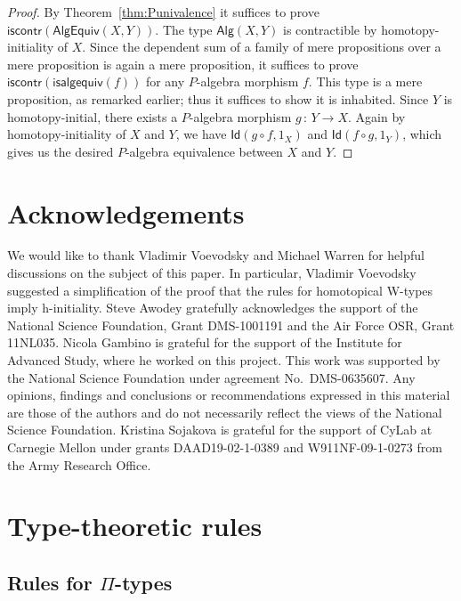\documentclass[10pt,a4paper,oneside,reqno]{amsart}
\theoremstyle{mythm}
\theoremstyle{mydef}
\theoremstyle{myrmk}
\newcommand{\co}{\,{:}\,}
\newcommand{\iscontr}{\mathsf{iscontr}}
\newcommand{\Id}{\mathsf{Id}}
\newcommand{\Palg}{\mathsf{Alg}}
\newcommand{\isalgequiv}{\mathsf{isalgequiv}}
\newcommand{\AlgEquiv}{\mathsf{AlgEquiv}}
\begin{document}
\begin{proof}
By Theorem~\ref{thm:Punivalence} it suffices to prove $\iscontr(\AlgEquiv(X,Y))$. The type $\Palg(X,Y)$ is contractible by homotopy-initiality of $X$. Since the dependent sum of a family of mere propositions over a mere proposition is again a mere proposition, it suffices to prove $\iscontr(\isalgequiv(f))$ for any $P$-algebra morphism $f$. This type is a mere proposition, as remarked earlier; thus it suffices to show it is inhabited.
Since $Y$ is homotopy-initial, there exists a $P$-algebra morphism $g \co Y \to X$. Again by homotopy-initiality of $X$ and 
$Y$, we have $\Id(g \circ f, 1_X)$ and $\Id(f \circ g, 1_Y)$, which gives us the desired $P$-algebra equivalence between 
$X$ and $Y$.
\end{proof}

\newpage

\section*{Acknowledgements}

We would like to thank Vladimir Voevodsky and Michael Warren for helpful discussions
on the subject of this paper. In particular, Vladimir Voevodsky suggested a simplification of the 
proof that the rules for homotopical W-types imply h-initiality. 
 Steve Awodey gratefully acknowledges the support of the National Science Foundation, Grant DMS-1001191 and the Air Force OSR, Grant 11NL035. Nicola Gambino is grateful for the support of the Institute for Advanced Study, where
he worked on this project. This work was supported by the National Science Foundation 
under agreement No.\ DMS-0635607. Any opinions, findings and conclusions or recommendations
expressed in this material are those of the authors and do not necessarily reflect the views of
the National Science Foundation. Kristina Sojakova is grateful for the support of CyLab at Carnegie
Mellon under grants DAAD19-02-1-0389 and W911NF-09-1-0273 from the Army
Research Office.

\newpage


\appendix

\section{Type-theoretic rules}
\label{app:rules}

\subsection*{Rules for $\Pi$-types}
\end{document}
